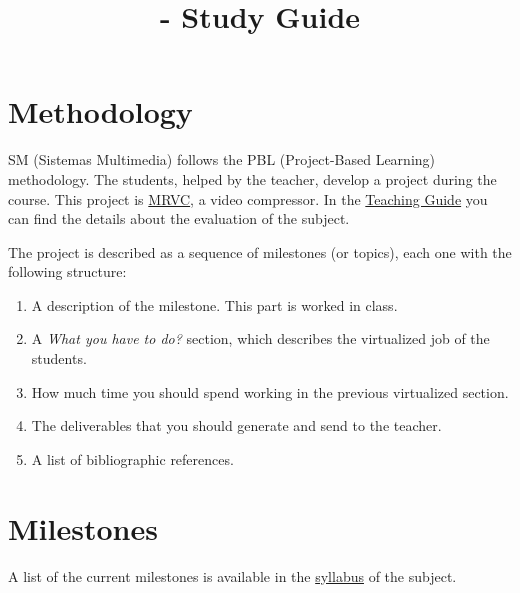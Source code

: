 
\title{\SM - Study Guide}

\maketitle

\section{Methodology}
SM (Sistemas Multimedia) follows the PBL (Project-Based Learning)
methodology. The students, helped by the teacher, develop a project
during the course. This project is
\href{https://github.com/Sistemas-Multimedia/MRVC}{MRVC}, a video
compressor. In the
\href{http://portafirma.ual.es/pfirma/downloadReport/file?idDocument=Y3iGKKA5Lb&idRequest=vo8X8SLOXQ}{Teaching
  Guide} you can find the details about the evaluation of the subject.

The project is described as a sequence of milestones (or topics), each
one with the following structure:
\begin{enumerate}
\item A description of the milestone. This part is worked in class.
\item A \emph{What you have to do?} section, which describes the
  virtualized job of the students.
\item How much time you should spend working in the previous
  virtualized section.
\item The deliverables that you should generate and send to the
  teacher.
\item A list of bibliographic references.
\end{enumerate}

\section{Milestones}
A list of the current milestones is available in the
\href{https://sistemas-multimedia.github.io/syllabus}{syllabus} of the
subject.

